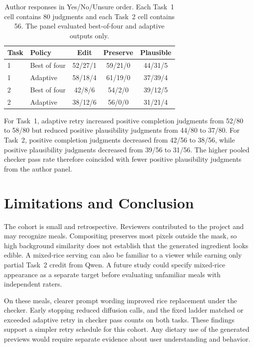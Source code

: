 \begin{table}[t]
\centering\small
\begin{tabular}{@{}llccc@{}}\toprule
Task & Policy & Edit & Preserve & Plausible\\\midrule
1 & Best of four & 52/27/1 & 59/21/0 & 44/31/5\\
1 & Adaptive & 58/18/4 & 61/19/0 & 37/39/4\\
2 & Best of four & 42/8/6 & 54/2/0 & 39/12/5\\
2 & Adaptive & 38/12/6 & 56/0/0 & 31/21/4\\\bottomrule
\end{tabular}
\caption{Author responses in Yes/No/Unsure order. Each Task~1 cell contains 80 judgments and each Task~2 cell contains 56. The panel evaluated best-of-four and adaptive outputs only.}\label{tab:human}
\end{table}

For Task~1, adaptive retry increased positive completion judgments from 52/80 to 58/80 but reduced positive plausibility judgments from 44/80 to 37/80. For Task~2, positive completion judgments decreased from 42/56 to 38/56, while positive plausibility judgments decreased from 39/56 to 31/56. The higher pooled checker pass rate therefore coincided with fewer positive plausibility judgments from the author panel.

\section{Limitations and Conclusion}

The cohort is small and retrospective. Reviewers contributed to the project and may recognize meals. Compositing preserves most pixels outside the mask, so high background similarity does not establish that the generated ingredient looks edible. A mixed-rice serving can also be familiar to a viewer while earning only partial Task~2 credit from Qwen. A future study could specify mixed-rice appearance as a separate target before evaluating unfamiliar meals with independent raters.

On these meals, clearer prompt wording improved rice replacement under the checker. Early stopping reduced diffusion calls, and the fixed ladder matched or exceeded adaptive retry in checker pass counts on both tasks. These findings support a simpler retry schedule for this cohort. Any dietary use of the generated previews would require separate evidence about user understanding and behavior.

{\small}
